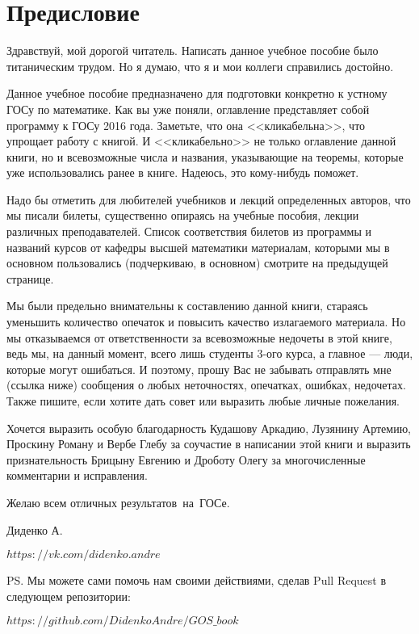 \chapter{Предисловие}
Здравствуй, мой дорогой читатель. Написать данное учебное пособие было титаническим трудом. Но я думаю, что я и мои коллеги справились достойно.

Данное учебное пособие предназначено для подготовки конкретно к устному ГОСу по математике. Как вы уже поняли, оглавление представляет собой программу к ГОСу 2016 года. Заметьте, что она <<кликабельна>>, что упрощает работу с книгой. И <<кликабельно>> не только оглавление данной книги, но и всевозможные числа и названия, указывающие на теоремы, которые уже использовались ранее в книге. Надеюсь, это кому-нибудь поможет. 

Надо бы отметить для любителей учебников и лекций определенных авторов, что мы писали билеты, существенно опираясь на учебные пособия, лекции различных преподавателей. Список соответствия билетов из программы и названий курсов от кафедры высшей математики материалам, которыми мы в основном пользовались (подчеркиваю, в основном) смотрите на предыдущей странице.

Мы были предельно внимательны к составлению данной книги, стараясь уменьшить количество опечаток и повысить качество излагаемого материала. Но мы отказываемся от ответственности за всевозможные недочеты в этой книге, ведь мы, на данный момент, всего лишь студенты 3-ого курса, а главное --- люди, которые могут ошибаться. И поэтому, прошу Вас не забывать отправлять мне (ссылка ниже) сообщения о любых неточностях, опечатках, ошибках, недочетах. Также пишите, если хотите дать совет или выразить любые личные пожелания. 

Хочется выразить особую благодарность Кудашову Аркадию, Лузянину Артемию, Проскину Роману и Вербе Глебу за соучастие в написании этой книги и выразить признательность Брицыну Евгению и Дроботу Олегу за многочисленные комментарии и исправления.
 
\vspace*{\baselineskip}

Желаю всем отличных результатов~на~ГОСе.

\mbox{}

\noindent Диденко А. 

\noindent\href{https://vk.com/didenko.andre}{$https://vk.com/didenko.andre$}

\mbox{}

\noindent PS. Мы можете сами помочь нам своими действиями, сделав Pull Request в следующем репозитории:

\noindent\href{https://github.com/DidenkoAndre/GOS_book}{$https://github.com/DidenkoAndre/GOS\_book$}